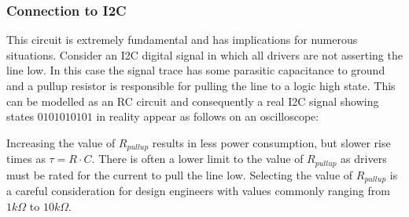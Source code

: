 \documentclass[main.tex]{subfiles}
\begin{document}



\subsubsection{Connection to I2C} 
This circuit is extremely fundamental and has implications for numerous situations. Consider an I2C digital signal in which all drivers are not asserting the line low. In this case the signal trace has some parasitic capacitance to ground and a pullup resistor is responsible for pulling the line to a logic high state. This can be modelled as an RC circuit and consequently a real I2C signal showing states $0101010101$ in reality appear as follows on an oscilloscope:


Increasing the value of $R_{pullup}$ results in less power consumption, but slower rise times as $\tau = R \cdot C$. There is often a lower limit to the value of $R_{pullup}$ as drivers must be rated for the current to pull the line low. Selecting the value of $R_{pullup}$ is a careful consideration for design engineers with values commonly ranging from $1 k \Omega$ to $10 k \Omega$.
\end{document}
